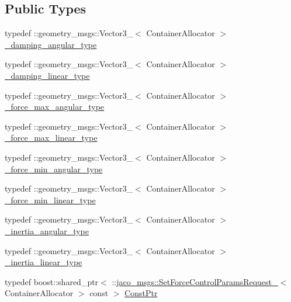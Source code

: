 \subsection*{Public Types}
\begin{DoxyCompactItemize}
\item 
typedef \+::geometry\+\_\+msgs\+::\+Vector3\+\_\+$<$ Container\+Allocator $>$ \hyperlink{structjaco__msgs_1_1SetForceControlParamsRequest___a237f71deae909129820dbba65df1a9ab}{\+\_\+damping\+\_\+angular\+\_\+type}
\item 
typedef \+::geometry\+\_\+msgs\+::\+Vector3\+\_\+$<$ Container\+Allocator $>$ \hyperlink{structjaco__msgs_1_1SetForceControlParamsRequest___adc25193330852db72172327eabad17a8}{\+\_\+damping\+\_\+linear\+\_\+type}
\item 
typedef \+::geometry\+\_\+msgs\+::\+Vector3\+\_\+$<$ Container\+Allocator $>$ \hyperlink{structjaco__msgs_1_1SetForceControlParamsRequest___adcfd9cb3d8af6d83169e04fd708d9e43}{\+\_\+force\+\_\+max\+\_\+angular\+\_\+type}
\item 
typedef \+::geometry\+\_\+msgs\+::\+Vector3\+\_\+$<$ Container\+Allocator $>$ \hyperlink{structjaco__msgs_1_1SetForceControlParamsRequest___a8f99b85942145effd0d125e03c36c3b2}{\+\_\+force\+\_\+max\+\_\+linear\+\_\+type}
\item 
typedef \+::geometry\+\_\+msgs\+::\+Vector3\+\_\+$<$ Container\+Allocator $>$ \hyperlink{structjaco__msgs_1_1SetForceControlParamsRequest___a3c572a2972a591dc6d8ac2e7490919e8}{\+\_\+force\+\_\+min\+\_\+angular\+\_\+type}
\item 
typedef \+::geometry\+\_\+msgs\+::\+Vector3\+\_\+$<$ Container\+Allocator $>$ \hyperlink{structjaco__msgs_1_1SetForceControlParamsRequest___aaaf1a2020f17e7b8ff8e0b368f511353}{\+\_\+force\+\_\+min\+\_\+linear\+\_\+type}
\item 
typedef \+::geometry\+\_\+msgs\+::\+Vector3\+\_\+$<$ Container\+Allocator $>$ \hyperlink{structjaco__msgs_1_1SetForceControlParamsRequest___a6f395e799c9b87fa1ed44f2639681860}{\+\_\+inertia\+\_\+angular\+\_\+type}
\item 
typedef \+::geometry\+\_\+msgs\+::\+Vector3\+\_\+$<$ Container\+Allocator $>$ \hyperlink{structjaco__msgs_1_1SetForceControlParamsRequest___a72df435d24614736e733258c4a1b8919}{\+\_\+inertia\+\_\+linear\+\_\+type}
\item 
typedef boost\+::shared\+\_\+ptr$<$ \+::\hyperlink{structjaco__msgs_1_1SetForceControlParamsRequest__}{jaco\+\_\+msgs\+::\+Set\+Force\+Control\+Params\+Request\+\_\+}$<$ Container\+Allocator $>$ const  $>$ \hyperlink{structjaco__msgs_1_1SetForceControlParamsRequest___ae148bd5dd3c40a09e1af84e3a2ed245a}{Const\+Ptr}

\end{DoxyCompactItemize}
